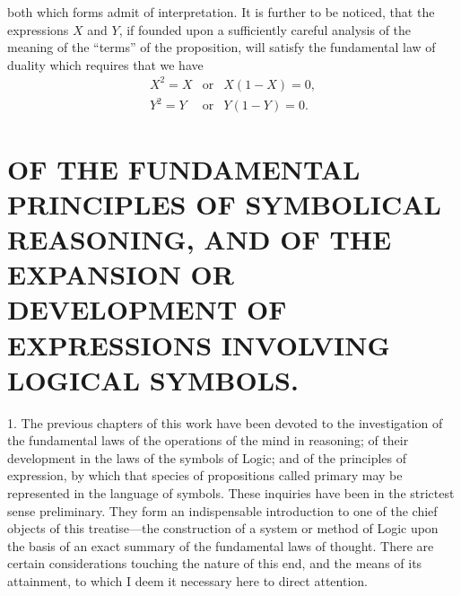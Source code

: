 \documentclass[oneside]{book}
\begin{document}
both which forms admit of interpretation. It is further to be
noticed, that the expressions $X$ and $Y$, if founded upon a sufficiently
careful analysis of the meaning of the ``terms'' of the
proposition, will satisfy the fundamental law of duality which
requires that we have
\begin{eqnarray*}
X^2 = X &\textrm{or}& X \left( 1 - X \right) = 0,\\
Y^2 = Y &\textrm{or}& Y \left( 1 - Y \right) = 0.
\end{eqnarray*}

\chapter[PRINCIPLES OF SYMBOLIC REASONING]
{\large OF THE FUNDAMENTAL PRINCIPLES OF SYMBOLICAL REASONING, AND
OF THE EXPANSION OR DEVELOPMENT OF EXPRESSIONS INVOLVING
LOGICAL SYMBOLS.}

1. The previous chapters of this work have been devoted to
the investigation of the fundamental laws of the operations
of the mind in reasoning; of their development in the
laws of the symbols of Logic; and of the principles of expression,
by which that species of propositions called primary may be represented
in the language of symbols. These inquiries have been
in the strictest sense preliminary. They form an indispensable
introduction to one of the chief objects of this treatise---the construction
of a system or method of Logic upon the basis of an
exact summary of the fundamental laws of thought. There are
certain considerations touching the nature of this end, and the
means of its attainment, to which I deem it necessary here to
direct attention.
\end{document}
